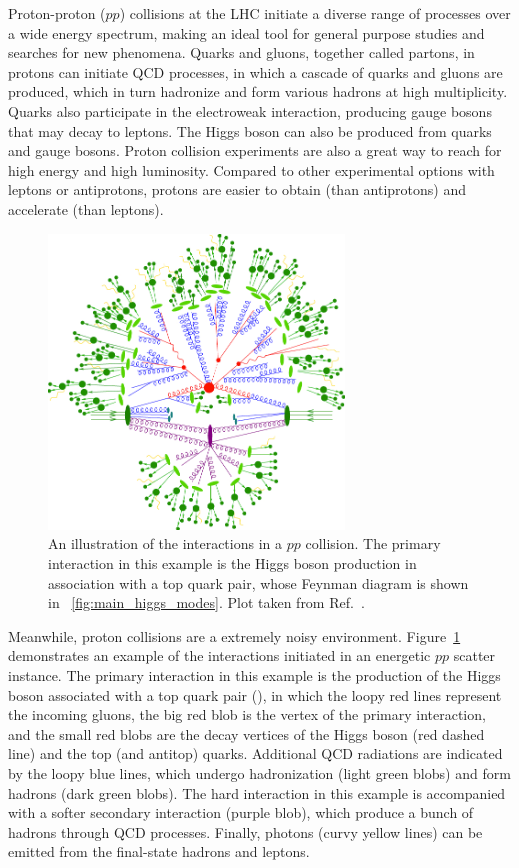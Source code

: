 Proton-proton ($pp$) collisions at the LHC initiate a diverse range of processes over a wide energy spectrum,
making an ideal tool for general purpose studies and searches for new phenomena.
Quarks and gluons, together called partons, in protons can initiate QCD processes, 
in which a cascade of quarks and gluons are produced, which in turn hadronize and form various hadrons at high multiplicity.
Quarks also participate in the electroweak interaction, producing gauge bosons that may decay to leptons.
The Higgs boson can also be produced from quarks and gauge bosons.
Proton collision experiments are also a great way to reach for high energy and high luminosity.
Compared to other experimental options with leptons or antiprotons, 
protons are easier to obtain (than antiprotons) and accelerate (than leptons).

\begin{figure}[!htb]
    \centering
    \includegraphics[width=0.70\textwidth]{pics/LHC_CMS/sherpa_sim.png}
    \caption{An illustration of the interactions in a $pp$ collision.
             The primary interaction in this example is the Higgs boson production in association with a top quark pair, 
             whose Feynman diagram is shown in ~\ref{fig:main_higgs_modes}.
             Plot taken from Ref.~\cite{Gleisberg_2009}.}
    \label{fig:sherpa_pp}
\end{figure}

Meanwhile, proton collisions are a extremely noisy environment.
Figure~\ref{fig:sherpa_pp} demonstrates an example of the interactions initiated in an energetic $pp$ scatter instance.
The primary interaction in this example is the production of the Higgs boson associated with a top quark pair (\ttH),
in which the loopy red lines represent the incoming gluons, the big red blob is the vertex of the primary interaction,
and the small red blobs are the decay vertices of the Higgs boson (red dashed line) and the top (and antitop) quarks.
Additional QCD radiations are indicated by the loopy blue lines, which undergo hadronization (light green blobs) and form hadrons (dark green blobs). 
The hard interaction in this example is accompanied with a softer secondary interaction (purple blob), 
which produce a bunch of hadrons through QCD processes.
Finally, photons (curvy yellow lines) can be emitted from the final-state hadrons and leptons.

